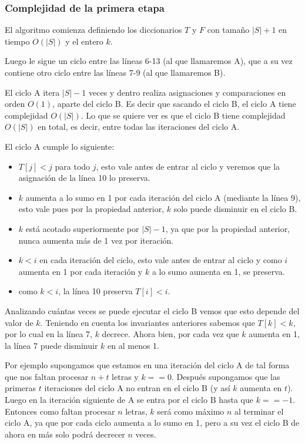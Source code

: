 \subsubsection{Complejidad de la primera etapa}

El algoritmo comienza definiendo los diccionarios $T$ y $F$ con tamaño $|S|+1$ en tiempo $O(|S|)$ y el entero $k$.

Luego le sigue un ciclo entre las líneas 6-13 (al que llamaremos A), que a su vez contiene otro ciclo
entre las líneas 7-9 (al que llamaremos B).

El ciclo A itera $|S|-1$ veces y dentro realiza asignaciones y comparaciones en orden $O(1)$, aparte del ciclo B. Es decir que
sacando el ciclo B, el ciclo A tiene complejidad $O(|S|)$. Lo que se quiere ver es que el ciclo B tiene
complejidad $O(|S|)$ en total, es decir, entre todas las iteraciones del ciclo A.

El ciclo A cumple lo siguiente:
\begin{itemize}
	\item $T[j] < j$ para todo $j$, esto vale antes de entrar al ciclo
	y veremos que la asignación de la línea 10 lo preserva.
	\item $k$ aumenta a lo sumo en 1 por cada iteración del ciclo A (mediante la línea 9), esto vale pues por la
	propiedad anterior, $k$ solo puede disminuir en el ciclo B.
	\item $k$ está acotado superiormente por $|S|-1$, ya que por la propiedad anterior, nunca
	aumenta más de 1 vez por iteración.
	\item $k < i$ en cada iteración del ciclo, esto vale antes de entrar al ciclo
	y como $i$ aumenta en 1 por cada iteración y $k$ a lo sumo aumenta en 1, se preserva.
	\item como $k < i$, la línea 10 preserva $T[i] < i$.
\end{itemize}

Analizando cuántas veces se puede ejecutar el ciclo B vemos que esto depende del valor de $k$.
Teniendo en cuenta los invariantes anteriores sabemos que $T[k] < k$, por lo cual en la línea 7,
$k$ decrece. Ahora bien, por cada vez que $k$ aumenta en 1, la línea 7 puede disminuir $k$ en al menos 1.

Por ejemplo supongamos que estamos en una iteración del ciclo A de tal forma que nos faltan procesar $n+t$
letras y $k == 0$. Después supongamos que las primeras $t$ iteraciones del ciclo A no entran en el ciclo B
(y así $k$ aumenta en $t$). Luego en la iteración siguiente de A se entra por el ciclo B hasta que
$k == -1$. Entonces como faltan procesar $n$ letras, $k$ será como máximo $n$ al terminar el ciclo A, 
ya que por cada ciclo aumenta a lo sumo en 1, pero a su vez el ciclo B de ahora en más solo podrá
decrecer $n$ veces.

